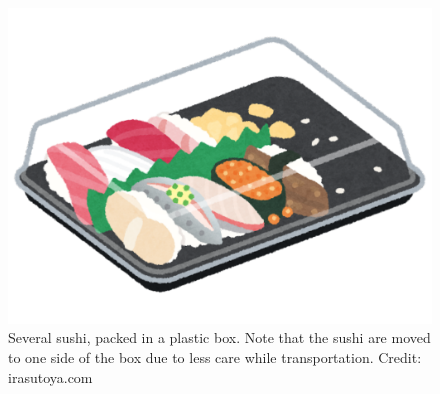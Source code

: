 \begin{figure}[ht]
    \centering
    \includegraphics[width=\linewidth]{figures/sushi/sushi.pdf}
    \caption{Several sushi, packed in a plastic box. Note that the sushi are moved to one side of the box due to less care while transportation. Credit: irasutoya.com}
    \label{fig:sushi}
\end{figure}